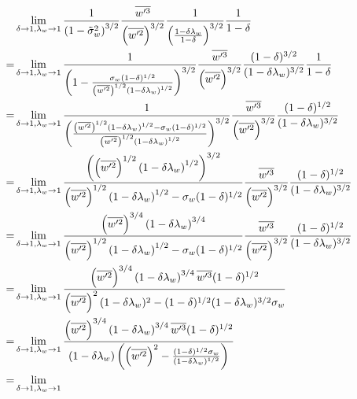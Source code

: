\begin{align}
    &\lim_{\delta \to 1, \lambda_w \to 1}
    \frac{1}{\tswfact^{3/2}}
    \frac{\wpthree}{\left(\wptwo \right)^{3/2}}
    \frac{1}{\left(\frac{1-\delta \lambda_w}{1-\delta}\right)^{3/2}}
    \frac{1}{1-\delta} \nonumber \\
    =&\lim_{\delta \to 1, \lambda_w \to 1}
    \frac{1}{\left(1-\frac{\sigma_w (1-\delta)^{1/2}}
    {\left(\wptwo\right)^{1/2} \left(1-\delta\lambda_w\right)^{1/2}}\right)^{3/2}}
    \frac{\wpthree}{\left(\wptwo \right)^{3/2}}
    \frac{(1-\delta)^{3/2}}{(1-\delta \lambda_w)^{3/2}}
    \frac{1}{1-\delta} \nonumber \\
    =&\lim_{\delta \to 1, \lambda_w \to 1}
    \frac{1}{
        \left(\frac{\left(\wptwo\right)^{1/2} \left(1-\delta\lambda_w\right)^{1/2} - \sigma_w (1-\delta)^{1/2}}
        {\left(\wptwo\right)^{1/2} \left(1-\delta\lambda_w\right)^{1/2}}\right)^{3/2}
    }
    \frac{\wpthree}{\left(\wptwo \right)^{3/2}}
    \frac{(1-\delta)^{1/2}}{(1-\delta \lambda_w)^{3/2}}
    \nonumber \\
    =&\lim_{\delta \to 1, \lambda_w \to 1}
    \frac{\left(\left(\wptwo\right)^{1/2} \left(1-\delta\lambda_w\right)^{1/2}\right)^{3/2}}
    {\left(\wptwo\right)^{1/2} \left(1-\delta\lambda_w\right)^{1/2} - \sigma_w (1-\delta)^{1/2}}
    \frac{\wpthree}{\left(\wptwo \right)^{3/2}}
    \frac{(1-\delta)^{1/2}}{(1-\delta \lambda_w)^{3/2}}
    \nonumber \\
    =&\lim_{\delta \to 1, \lambda_w \to 1}
    \frac{\left(\wptwo\right)^{3/4} \left(1-\delta\lambda_w\right)^{3/4}}
    {\left(\wptwo\right)^{1/2} \left(1-\delta\lambda_w\right)^{1/2} - \sigma_w (1-\delta)^{1/2}}
    \frac{\wpthree}{\left(\wptwo \right)^{3/2}}
    \frac{(1-\delta)^{1/2}}{(1-\delta \lambda_w)^{3/2}}
    \nonumber \\
    =&\lim_{\delta \to 1, \lambda_w \to 1}
    \frac{
        \left(\wptwo\right)^{3/4} \left(1-\delta\lambda_w\right)^{3/4} \wpthree (1-\delta)^{1/2}
    }
    {
        \left(\wptwo\right)^2 (1-\delta \lambda_w)^2 -
        (1-\delta)^{1/2} (1-\delta \lambda_w)^{3/2} \sigma_w
    }
    \nonumber \\
    =&\lim_{\delta \to 1, \lambda_w \to 1}
    \frac{
        \left(\wptwo\right)^{3/4} \left(1-\delta\lambda_w\right)^{3/4} \wpthree (1-\delta)^{1/2}
    }
    {
        (1-\delta \lambda_w)
        \left(
        \left(\wptwo\right)^2 -
        \frac{(1-\delta)^{1/2} \sigma_w}{(1-\delta \lambda_w)^{1/2}}
        \right)
    }
    \nonumber \\
    =&\lim_{\delta \to 1, \lambda_w \to 1}

\end{align}
